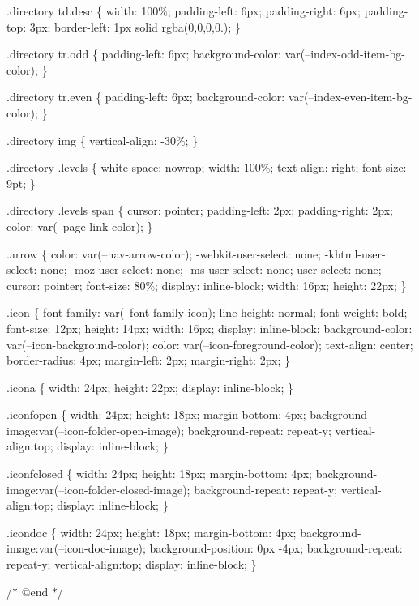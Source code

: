 .directory td.\+desc \{ width\+: 100\%; padding-\/left\+: 6px; padding-\/right\+: 6px; padding-\/top\+: 3px; border-\/left\+: 1px solid rgba(0,0,0,0.); \}

.directory tr.\+odd \{ padding-\/left\+: 6px; background-\/color\+: var(--index-\/odd-\/item-\/bg-\/color); \}

.directory tr.\+even \{ padding-\/left\+: 6px; background-\/color\+: var(--index-\/even-\/item-\/bg-\/color); \}

.directory img \{ vertical-\/align\+: -\/30\%; \}

.directory .levels \{ white-\/space\+: nowrap; width\+: 100\%; text-\/align\+: right; font-\/size\+: 9pt; \}

.directory .levels span \{ cursor\+: pointer; padding-\/left\+: 2px; padding-\/right\+: 2px; color\+: var(--page-\/link-\/color); \}

.arrow \{ color\+: var(--nav-\/arrow-\/color); -\/webkit-\/user-\/select\+: none; -\/khtml-\/user-\/select\+: none; -\/moz-\/user-\/select\+: none; -\/ms-\/user-\/select\+: none; user-\/select\+: none; cursor\+: pointer; font-\/size\+: 80\%; display\+: inline-\/block; width\+: 16px; height\+: 22px; \}

.icon \{ font-\/family\+: var(--font-\/family-\/icon); line-\/height\+: normal; font-\/weight\+: bold; font-\/size\+: 12px; height\+: 14px; width\+: 16px; display\+: inline-\/block; background-\/color\+: var(--icon-\/background-\/color); color\+: var(--icon-\/foreground-\/color); text-\/align\+: center; border-\/radius\+: 4px; margin-\/left\+: 2px; margin-\/right\+: 2px; \}

.icona \{ width\+: 24px; height\+: 22px; display\+: inline-\/block; \}

.iconfopen \{ width\+: 24px; height\+: 18px; margin-\/bottom\+: 4px; background-\/image\+:var(--icon-\/folder-\/open-\/image); background-\/repeat\+: repeat-\/y; vertical-\/align\+:top; display\+: inline-\/block; \}

.iconfclosed \{ width\+: 24px; height\+: 18px; margin-\/bottom\+: 4px; background-\/image\+:var(--icon-\/folder-\/closed-\/image); background-\/repeat\+: repeat-\/y; vertical-\/align\+:top; display\+: inline-\/block; \}

.icondoc \{ width\+: 24px; height\+: 18px; margin-\/bottom\+: 4px; background-\/image\+:var(--icon-\/doc-\/image); background-\/position\+: 0px -\/4px; background-\/repeat\+: repeat-\/y; vertical-\/align\+:top; display\+: inline-\/block; \}

/\texorpdfstring{$\ast$}{*} @end \texorpdfstring{$\ast$}{*}/

